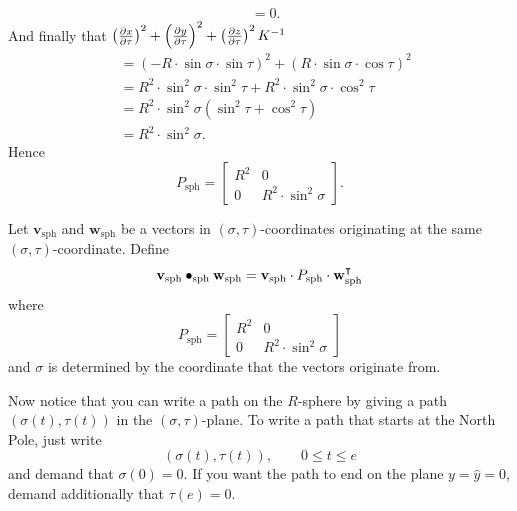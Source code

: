 \documentclass[newpage,hints,handout]{ximera}
\begin{document}
\begin{problem}
\begin{freeResponse}
\begin{align*}
      &= 0.
    \end{align*}
    And finally that $\left(\pp[x]{\tau}\right)^2 + \left(\pp[y]{\tau}\right)^2 + \left(\pp[z]{\tau}\right)^2K^{-1}$
     \begin{align*}
       &= \left(-R\cdot \sin\sigma\cdot \sin \tau \right)^2 + \left( R\cdot \sin\sigma\cdot \cos\tau \right)^2 \\
       &= R^2\cdot \sin^2\sigma\cdot \sin^2 \tau + R^2\cdot \sin^2\sigma\cdot \cos^2\tau \\
       &= R^2\cdot \sin^2\sigma\left(\sin^2 \tau + \cos^2\tau\right) \\
       &= R^2\cdot \sin^2\sigma.
     \end{align*}
     Hence
     \[
     P_\mathrm{sph} =
  \begin{bmatrix}
    R^2 & 0 \\
    0 & R^2\cdot\sin^2 \sigma
  \end{bmatrix}.
     \]
  \end{freeResponse}
\end{problem}

\begin{definition}
  Let $\mathbf{v}_\mathrm{sph}$ and $\mathbf{w}_\mathrm{sph}$ be a vectors in
  $(\sigma,\tau)$-coordinates originating at the same
  $(\sigma,\tau)$-coordinate. Define
  \[
  \mathbf{v}_\mathrm{sph} \bullet_\mathrm{sph} \mathbf{w}_\mathrm{sph} = \mathbf{v}_\mathrm{sph} \cdot P_\mathrm{sph} \cdot \mathbf{w}_\mathrm{sph}^\transpose
  \]
  where
  \[
  P_\mathrm{sph} =
  \begin{bmatrix}
    R^2 & 0 \\
    0 & R^2\cdot\sin^2 \sigma
  \end{bmatrix}
  \]
  and $\sigma$ is determined by the coordinate that the vectors
  originate from.
\end{definition}


Now notice that you can write a path on the $R$-sphere by giving a path
$\left( \sigma(t),\tau(t)\right)$ in the $(\sigma,\tau)$-plane.  To write a path
that starts at the North Pole, just write%
\[
\left(\sigma(t),\tau(t)\right), \qquad 0\leq t \leq e
\]
and demand that $\sigma(0)=0$.  If you want the path to end on the plane
$y=\hat{y}=0$, demand additionally that $\tau(e)=0.$

\end{document}
